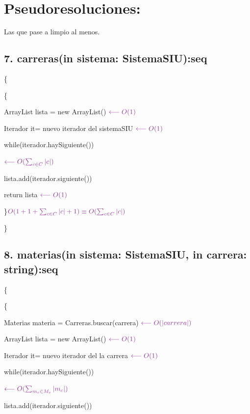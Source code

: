 \documentclass[a4paper,10pt]{article}
\begin{document}
\section*{Pseudoresoluciones:}
{\vspace*{-2ex}\hspace*{4em} \small Las que pase a limpio al menos.}


\subsection*{7. carreras(in sistema: SistemaSIU):seq}
\{

\{

    ArrayList lista = new ArrayList() \hfill $\color{Purple}\longleftarrow O(1)$
    
    Iterador it= nuevo iterador del sistemaSIU \hfill $\color{Purple}\longleftarrow O(1)$

    while(iterador.haySiguiente()){\hfill $\color{Purple}\longleftarrow O(\sum_{c\in C}^{} |c|)$

        \hspace*{1.5em} lista.add(iterador.siguiente())

    }

    return lista \hfill $\color{Purple}\longleftarrow O(1)$

\}\hfill $\color{Purple} O(1+1+\sum_{c\in C}^{} |c| +1 )\equiv O(\sum_{c\in C}^{} |c|)$

\noindent\}

\salto{\baselineskip}

\subsection*{8. materias(in sistema: SistemaSIU, in carrera: string):seq}
\{

\{

    Materias materia = Carreras.buscar(carrera) \hfill $\color{Purple}\longleftarrow O(|carrera|)$

    ArrayList lista = new ArrayList() \hfill $\color{Purple}\longleftarrow O(1)$
    
    Iterador it= nuevo iterador del la carrera \hfill $\color{Purple}\longleftarrow O(1)$

    while(iterador.haySiguiente()){\hfill $\color{Purple}\longleftarrow O(\sum_{m_c\in M_c}^{} |m_c|)$

        \hspace*{1.5em} lista.add(iterador.siguiente())

    }
\end{document}
